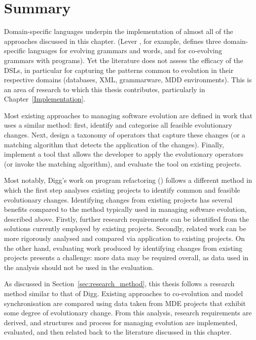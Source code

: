 \section{Summary}
Domain-specific languages underpin the implementation of almost all of the approaches discussed in this chapter. (Lever \cite{pizka07automating}, for example, defines three domain-specific languages for evolving grammars and words, and for co-evolving grammars with programs). Yet the literature does not assess the efficacy of the DSLs, in particular for capturing the patterns common to evolution in their respective domains (databases, XML, grammarware, MDD environments). This is an area of research to which this thesis contributes, particularly in Chapter~\ref{Implementation}.

Most existing approaches to managing software evolution are defined in work that uses a similar method: first, identify and categorise all feasible evolutionary changes. Next, design a taxonomy of operators that capture these changes (or a matching algorithm that detects the application of the changes). Finally, implement a tool that allows the developer to apply the evolutionary operators (or invoke the matching algorithm), and evaluate the tool on existing projects.

Most notably, Digg's work on program refactoring (\cite{dig06apis,dig06automatic,dig06detection,dig07cms}) follows a different method in which the first step analyses existing projects to identify common and feasible evolutionary changes. Identifying changes from existing projects has several benefits compared to the method typically used in managing software evolution, described above. Firstly, further research requirements can be identified from the solutions currently employed by existing projects. Secondly, related work can be more rigorously analysed and compared via application to existing projects. On the other hand, evaluating work produced by identifying changes from existing projects presents a challenge: more data may be required overall, as data used in the analysis should not be used in the evaluation.

As discussed in Section~\ref{sec:research_method}, this thesis follows a research method similar to that of Digg. Existing approaches to co-evolution and model synchronisation are compared using data taken from MDE projects that exhibit some degree of evolutionary change. From this analysis, research requirements are derived, and structures and process for managing evolution are implemented, evaluated, and then related back to the literature discussed in this chapter.